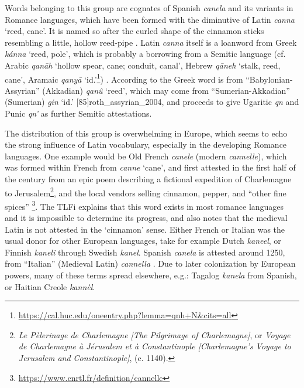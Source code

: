 Words belonging to this group are cognates of Spanish \textit{canela} and its variants in Romance languages, which have been formed with the diminutive of Latin \textit{canna} `reed, cane'. It is named so after the curled shape of the cinnamon sticks resembling a little, hollow reed-pipe . Latin \textit{canna} itself is a loanword from Greek 
\textit{kánna} `reed, pole', which is probably a borrowing from a Semitic language (cf. Arabic 
\textit{qan\={a}h} `hollow spear, cane; conduit, canal', Hebrew 
\textit{qāneh} `stalk, reed, cane', Aramaic  
\textit{qanyā} `id.'\footnote{\url{https://cal.huc.edu/oneentry.php?lemma=qnh+N&cits=all}}) . According to \textcite[636]{beekes_etymological_2010} the Greek word is from ``Babylonian-Assyrian'' (Akkadian) \cu{\GA\NU\UU\UM} \textit{qanû} `reed', which may come from ``Sumerian-Akkadian'' (Sumerian) \cu{\GI} \textit{gin} `id.' [85]{roth_assyrian_2004}, and proceeds to give Ugaritic \textit{qn} and Punic \textit{qn'} as further Semitic attestations.

The distribution of this group is overwhelming in Europe, which seems to echo the strong influence of Latin vocabulary, especially in the developing Romance languages. One example would be Old French \textit{canele} (modern \textit{cannelle}), which was formed within French from \textit{canne} `cane', and first attested in the first half of the  century from an epic poem describing a fictional expedition of Charlemagne to Jerusalem\footnote{\textit{Le Pèlerinage de Charlemagne [The Pilgrimage of Charlemagne]}, or \textit{Voyage de Charlemagne à Jérusalem et à Constantinople [Charlemagne's Voyage to Jerusalem and Constantinople]}, (c. 1140).}, and the local vendors selling cinnamon, pepper, and ``other fine spices'' \footnote{\url{https://www.cnrtl.fr/definition/cannelle}}. The \gls{TLFi} explains that this word exists in most romance languages and it is impossible to determine its progress, and also notes that the medieval Latin is not attested in the `cinnamon' sense. Either French or Italian was the usual donor for other European languages, take for example Dutch \textit{kaneel}, or Finnish \textit{kaneli} through Swedish \textit{kanel}. Spanish \textit{canela} is attested around 1250, from ``Italian'' (Medieval Latin) \textit{cannella} \parencites[125]{corominas_breve_1987}[98]{gomez_de_silva_elseviers_1985}. Due to later colonization by European powers, many of these terms spread elsewhere, e.g.: Tagalog \textit{kanela} from Spanish, or Haitian Creole \textit{kannèl}.

